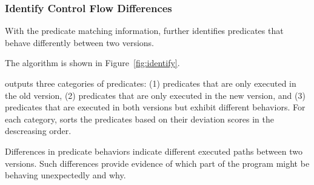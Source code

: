 


\subsubsection{Identify Control Flow Differences}
\label{sec:identify_diff}

With the predicate matching information, \ourtool further
identifies predicates that behave differently
between two versions. 

The algorithm is shown in Figure~\ref{fig:identify}. \ourtool
{}

\ourtool outputs three categories of predicates:
(1) predicates that are only executed in the
old version, (2) predicates that are only executed
in the new version, and (3) predicates that
are executed in both versions but exhibit different
behaviors. For each category, \ourtool sorts the
predicates based on their deviation scores in the
descreasing order.


Differences in predicate behaviors indicate different executed paths
between two versions. Such differences provide evidence of
which part of the program might be behaving unexpectedly and why.


